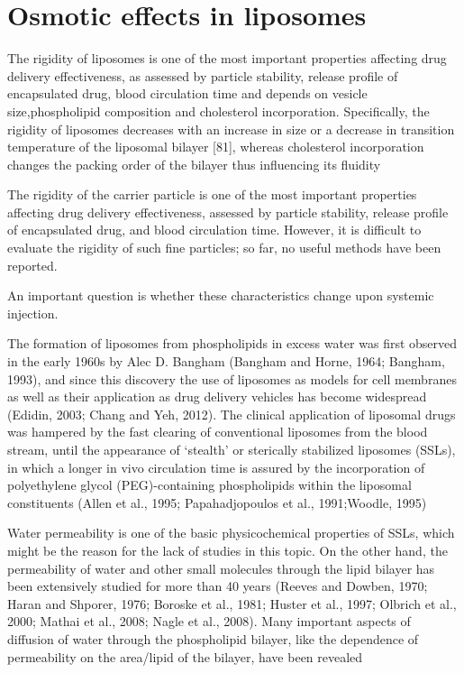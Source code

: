 \section{Osmotic effects in liposomes}

The  rigidity  of  liposomes  is  one  of  the  most  important properties affecting drug delivery effectiveness, as assessed by  particle  stability,  release  profile  of  encapsulated  drug, blood  circulation  time  and  depends  on  vesicle  size,phospholipid  composition  and  cholesterol  incorporation. Specifically,  the  rigidity  of  liposomes  decreases  with  an increase  in  size  or  a  decrease  in  transition  temperature  of the   liposomal   bilayer   [81],   whereas   cholesterol incorporation changes the packing order of the bilayer thus influencing   its   fluidity

The rigidity of the carrier particle is one of the most important properties affecting drug delivery effectiveness, assessed by particle stability, release profile of encapsulated drug, and blood circulation time. However, it is difficult to evaluate the rigidity of such fine particles; so far, no useful methods have been reported. 

An important question is whether these characteristics change upon systemic injection.

The formation of liposomes from phospholipids in excess water was first observed in the early 1960s by Alec D. Bangham (Bangham and Horne, 1964; Bangham, 1993), and since this discovery the use of liposomes as models for cell membranes as well as their application as drug delivery vehicles has become widespread (Edidin, 2003; Chang and Yeh, 2012). The clinical application of liposomal drugs was hampered by the fast clearing of conventional liposomes from the blood stream, until the appearance of ‘stealth’ or sterically stabilized liposomes (SSLs), in which a longer in vivo circulation time is assured by the incorporation of polyethylene glycol (PEG)-containing phospholipids within the liposomal constituents (Allen et al., 1995; Papahadjopoulos et al., 1991;Woodle, 1995)

Water permeability is one of the basic physicochemical properties of SSLs, which might be the reason for the lack of studies in this topic. On the other hand, the permeability of water and other small molecules through the lipid bilayer has been extensively studied for more than 40 years (Reeves and Dowben, 1970; Haran and Shporer, 1976; Boroske et al., 1981; Huster et al., 1997; Olbrich et al., 2000; Mathai et al., 2008; Nagle et al., 2008). Many important aspects of diffusion of water through the phospholipid bilayer, like the dependence of permeability on the area/lipid of the bilayer, have been revealed



